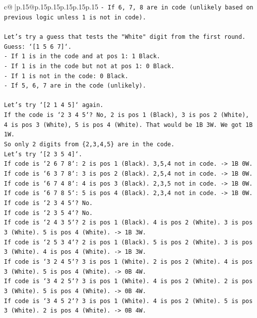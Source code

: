 \documentclass{article}
\begin{document}
{\begin{supertabular}{c@{$\;$}|p{.15\linewidth}@{}p{.15\linewidth}p{.15\linewidth}p{.15\linewidth}p{.15\linewidth}p{.15\linewidth}}
{{{\texttt{{-} If 6, 7, 8 are in code (unlikely based on previous logic unless 1 is not in code).} \\
\\ 
\texttt{Let's try a guess that tests the "White" digit from the first round.} \\
\texttt{Guess: `{[}1 5 6 7{]}`.} \\
\texttt{{-} If 1 is in the code and at pos 1: 1 Black.} \\
\texttt{{-} If 1 is in the code but not at pos 1: 0 Black.} \\
\texttt{{-} If 1 is not in the code: 0 Black.} \\
\texttt{{-} If 5, 6, 7 are in the code (unlikely).} \\
\\ 
\texttt{Let's try `{[}2 1 4 5{]}` again.} \\
\texttt{If the code is `2 3 4 5`? No, 2 is pos 1 (Black), 3 is pos 2 (White), 4 is pos 3 (White), 5 is pos 4 (White). That would be 1B 3W. We got 1B 1W.} \\
\texttt{So only 2 digits from \{2,3,4,5\} are in the code.} \\
\texttt{Let's try `{[}2 3 5 4{]}`.} \\
\texttt{If code is `2 6 7 8`: 2 is pos 1 (Black). 3,5,4 not in code. {-}> 1B 0W.} \\
\texttt{If code is `6 3 7 8`: 3 is pos 2 (Black). 2,5,4 not in code. {-}> 1B 0W.} \\
\texttt{If code is `6 7 4 8`: 4 is pos 3 (Black). 2,3,5 not in code. {-}> 1B 0W.} \\
\texttt{If code is `6 7 8 5`: 5 is pos 4 (Black). 2,3,4 not in code. {-}> 1B 0W.} \\
\texttt{If code is `2 3 4 5`? No.} \\
\texttt{If code is `2 3 5 4`? No.} \\
\texttt{If code is `2 4 3 5`? 2 is pos 1 (Black). 4 is pos 2 (White). 3 is pos 3 (White). 5 is pos 4 (White). {-}> 1B 3W.} \\
\texttt{If code is `2 5 3 4`? 2 is pos 1 (Black). 5 is pos 2 (White). 3 is pos 3 (White). 4 is pos 4 (White). {-}> 1B 3W.} \\
\texttt{If code is `3 2 4 5`? 3 is pos 1 (White). 2 is pos 2 (White). 4 is pos 3 (White). 5 is pos 4 (White). {-}> 0B 4W.} \\
\texttt{If code is `3 4 2 5`? 3 is pos 1 (White). 4 is pos 2 (White). 2 is pos 3 (White). 5 is pos 4 (White). {-}> 0B 4W.} \\
\texttt{If code is `3 4 5 2`? 3 is pos 1 (White). 4 is pos 2 (White). 5 is pos 3 (White). 2 is pos 4 (White). {-}> 0B 4W.} \\
}}}
\end{supertabular}}
\end{document}
